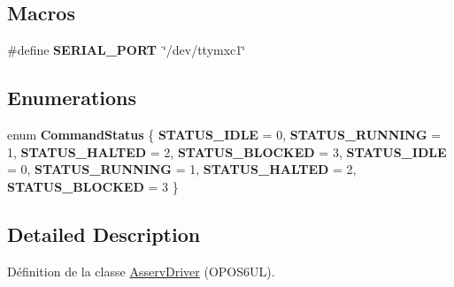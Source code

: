 \subsection*{Macros}
\begin{DoxyCompactItemize}
\item 
\mbox{\label{Driver-OPOS6UL__ARM_2AsservDriver_8hpp_ac08f8f916661bb5fc606373bea93d274}} 
\#define {\bfseries S\+E\+R\+I\+A\+L\+\_\+\+P\+O\+RT}~\char`\"{}/dev/ttymxc1\char`\"{}
\end{DoxyCompactItemize}
\subsection*{Enumerations}
\begin{DoxyCompactItemize}
\item 
\mbox{\label{Driver-OPOS6UL__ARM_2AsservDriver_8hpp_af56a0c8b912645f61cdb4aae207a2ef8}} 
enum {\bfseries Command\+Status} \{ \newline
{\bfseries S\+T\+A\+T\+U\+S\+\_\+\+I\+D\+LE} = 0, 
{\bfseries S\+T\+A\+T\+U\+S\+\_\+\+R\+U\+N\+N\+I\+NG} = 1, 
{\bfseries S\+T\+A\+T\+U\+S\+\_\+\+H\+A\+L\+T\+ED} = 2, 
{\bfseries S\+T\+A\+T\+U\+S\+\_\+\+B\+L\+O\+C\+K\+ED} = 3, 
\newline
{\bfseries S\+T\+A\+T\+U\+S\+\_\+\+I\+D\+LE} = 0, 
{\bfseries S\+T\+A\+T\+U\+S\+\_\+\+R\+U\+N\+N\+I\+NG} = 1, 
{\bfseries S\+T\+A\+T\+U\+S\+\_\+\+H\+A\+L\+T\+ED} = 2, 
{\bfseries S\+T\+A\+T\+U\+S\+\_\+\+B\+L\+O\+C\+K\+ED} = 3
 \}
\end{DoxyCompactItemize}


\subsection{Detailed Description}
Définition de la classe \hyperlink{classAsservDriver}{Asserv\+Driver} (O\+P\+O\+S6\+UL). 

